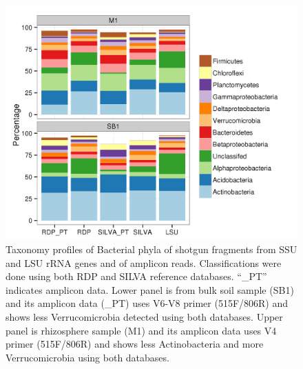 \documentclass[]{msu-thesis}
\begin{document}
\begin{figure}[tbph!]
  \centering
  \includegraphics[scale=1]{figs/chap2_fig4}
  \caption[Phylum profiles of shotgun fragments from SSU and LSU rRNA genes and of amplicon reads]{Taxonomy profiles of Bacterial phyla of shotgun fragments from SSU and LSU rRNA genes and of amplicon reads. Classifications were done using both RDP and SILVA reference databases. ``\_PT'' indicates amplicon data. Lower panel is from bulk soil sample (SB1) and its amplicon data (\_PT) uses V6-V8 primer (515F/806R) and shows less Verrucomicrobia detected using both databases. Upper panel is rhizosphere sample (M1) and its amplicon data uses V4 primer (515F/806R) and shows less Actinobacteria and more Verrucomicrobia using both databases.}
  \label{fig:chap2Fig4}
\end{figure}
\end{document}
